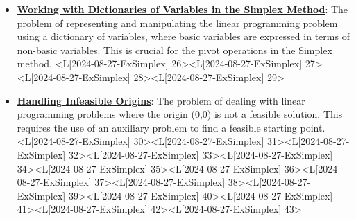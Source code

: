 \documentclass{article}%
\begin{document}
\begin{itemize}[[leftmargin=*]]
\item \href{https://www.math.purdue.edu/~yipn/421/2024-08-27-ExSimplex.pdf#page=26}{\textbf{Working with Dictionaries of Variables in the Simplex Method}}: The problem of representing and manipulating the linear programming problem using a dictionary of variables, where basic variables are expressed in terms of non-basic variables. This is crucial for the pivot operations in the Simplex method. <L[2024-08-27-ExSimplex] 26><L[2024-08-27-ExSimplex] 27><L[2024-08-27-ExSimplex] 28><L[2024-08-27-ExSimplex] 29>%
\item \href{https://www.math.purdue.edu/~yipn/421/2024-08-27-ExSimplex.pdf#page=30}{\textbf{Handling Infeasible Origins}}: The problem of dealing with linear programming problems where the origin (0,0) is not a feasible solution. This requires the use of an auxiliary problem to find a feasible starting point. <L[2024-08-27-ExSimplex] 30><L[2024-08-27-ExSimplex] 31><L[2024-08-27-ExSimplex] 32><L[2024-08-27-ExSimplex] 33><L[2024-08-27-ExSimplex] 34><L[2024-08-27-ExSimplex] 35><L[2024-08-27-ExSimplex] 36><L[2024-08-27-ExSimplex] 37><L[2024-08-27-ExSimplex] 38><L[2024-08-27-ExSimplex] 39><L[2024-08-27-ExSimplex] 40><L[2024-08-27-ExSimplex] 41><L[2024-08-27-ExSimplex] 42><L[2024-08-27-ExSimplex] 43>%
\end{itemize}%
\end{document}
